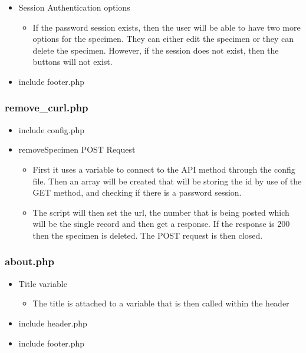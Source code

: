 \begin{itemize}
\begin{itemize}
            \end{itemize}
            \item Session Authentication options
            \begin{itemize}
                \item If the password session exists, then the user will be able to have two more options for the specimen. They can either edit the specimen or they can delete the specimen. However, if the session does not exist, then the buttons will not exist.
            \end{itemize}
            \item include footer.php
        \end{itemize}


    \subsubsection{remove\_curl.php}
        \begin{itemize}
            \item include config.php
            \item removeSpecimen POST Request
            \begin{itemize}
                \item First it uses a variable to connect to the API method through the config file. Then an array will be created that will be storing the id by use of the GET method, and checking if there is a  password session.
                \item The script will then set the url, the number that is being posted which will be the single record and then get a response. If the response is 200 then the specimen is deleted. The POST request is then closed.
            \end{itemize}
        \end{itemize}

    \subsubsection{about.php}
        \begin{itemize}
            \item Title variable
            \begin{itemize}
                \item The title is attached to a variable that is then called within the header
            \end{itemize}
            \item include header.php
            \item include footer.php
        \end{itemize}

